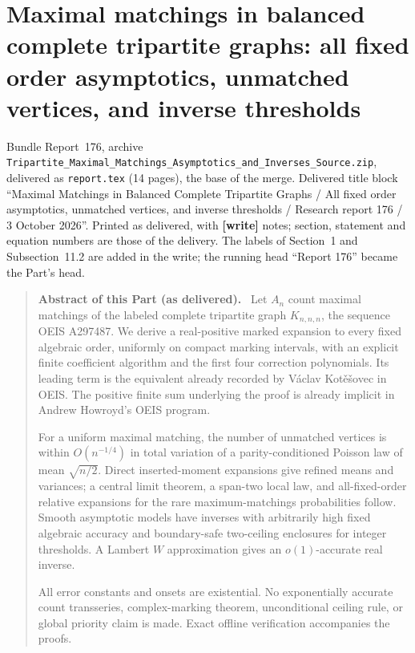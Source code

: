 \documentclass[11pt,letterpaper]{article}
\theoremstyle{remark}\newtheorem{remark}[theorem]{Remark}
\newcommand{\file}[1]{\nolinkurl{#1}}
\newenvironment{partabstract}{\begin{quote}\small\noindent\textbf{Abstract of this Part (as delivered).}\ }{\end{quote}}
\newcommand{\partsource}[1]{\par\noindent\begin{minipage}{\textwidth}\small #1\end{minipage}\par\medskip}
\begin{document}
\part{Maximal matchings in balanced complete tripartite graphs: all fixed order asymptotics, unmatched vertices, and inverse thresholds}\label{tmm:bal:part}
\partsource{Bundle Report~176, archive \file{Tripartite_Maximal_Matchings_Asymptotics_and_Inverses_Source.zip}, delivered as \file{report.tex} (14 pages), the base of the merge. Delivered title block ``Maximal Matchings in Balanced Complete Tripartite Graphs / All fixed order asymptotics, unmatched vertices, and inverse thresholds / Research report 176 / 3 October 2026''. Printed as delivered, with \textbf{[write]} notes; section, statement and equation numbers are those of the delivery. The labels of Section~1 and Subsection~11.2 are added in the write; the running head ``Report 176'' became the Part's head.}
\begin{partabstract}
Let $A_n$ count maximal matchings of the labeled complete tripartite graph $K_{n,n,n}$, the sequence OEIS A297487. We derive a real-positive marked expansion to every fixed algebraic order, uniformly on compact marking intervals, with an explicit finite coefficient algorithm and the first four correction polynomials. Its leading term is the equivalent already recorded by V\'aclav Kot\v e\v sovec in OEIS. The positive finite sum underlying the proof is already implicit in Andrew Howroyd's OEIS program.

For a uniform maximal matching, the number of unmatched vertices is within $O(n^{-1/4})$ in total variation of a parity-conditioned Poisson law of mean $\sqrt{n/2}$. Direct inserted-moment expansions give refined means and variances; a central limit theorem, a span-two local law, and all-fixed-order relative expansions for the rare maximum-matchings probabilities follow. Smooth asymptotic models have inverses with arbitrarily high fixed algebraic accuracy and boundary-safe two-ceiling enclosures for integer thresholds. A Lambert $W$ approximation gives an $o(1)$-accurate real inverse.

All error constants and onsets are existential. No exponentially accurate count transseries, complex-marking theorem, unconditional ceiling rule, or global priority claim is made. Exact offline verification accompanies the proofs.
\end{partabstract}
\end{document}
